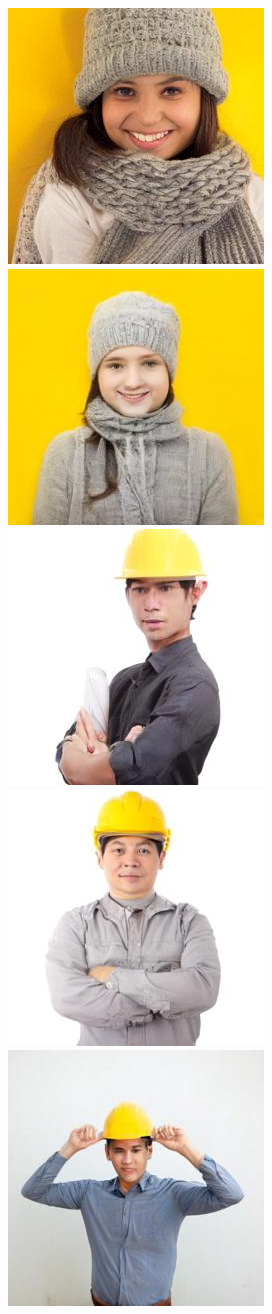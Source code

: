 \begin{figure}[h!]
\begin{subfigure}[t]{0.32\linewidth}
    	\includegraphics[width=0.32\linewidth]{figs/samples_appendix_4/base_cfg_2_ode_prompt_61_image_1.jpg}\;%
    	\includegraphics[width=0.32\linewidth]{figs/samples_appendix_4/base_cfg_2_ode_prompt_61_image_2.jpg}\\ 
    	\includegraphics[width=0.32\linewidth]{figs/samples_appendix_4/base_cfg_2_ode_prompt_63_image_0.jpg}\;%
    	\includegraphics[width=0.32\linewidth]{figs/samples_appendix_4/base_cfg_2_ode_prompt_63_image_1.jpg}\;%
    	\includegraphics[width=0.32\linewidth]{figs/samples_appendix_4/base_cfg_2_ode_prompt_63_image_2.jpg}

\end{subfigure}
\end{figure}
